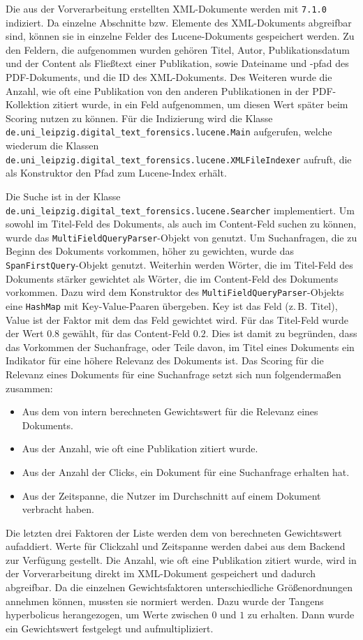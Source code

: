 Die aus der Vorverarbeitung erstellten XML-Dokumente werden mit
\lucene \lstinline{7.1.0} indiziert.  Da einzelne Abschnitte
bzw. Elemente des XML-Dokuments abgreifbar sind, können sie in
einzelne Felder des Lucene-Dokuments gespeichert werden.  Zu den
Feldern, die aufgenommen wurden gehören Titel, Autor,
Publikationsdatum und der Content als Fließtext einer Publikation,
sowie Dateiname und -pfad des PDF-Dokuments, und die ID des
XML-Dokuments.  Des Weiteren wurde die Anzahl, wie oft eine
Publikation von den anderen Publikationen in der PDF-Kollektion
zitiert wurde, in ein Feld aufgenommen, um diesen Wert später beim
Scoring nutzen zu können.  Für die Indizierung wird die Klasse
\lstinline{de.uni_leipzig.digital_text_forensics.lucene.Main}
aufgerufen, welche wiederum die Klassen
\lstinline{de.uni_leipzig.digital_text_forensics.lucene.XMLFileIndexer}
aufruft, die als Konstruktor den Pfad zum Lucene-Index erhält.

Die Suche ist in der Klasse \lstinline{de.uni_leipzig.digital_text_forensics.lucene.Searcher} implementiert. 
Um sowohl im Titel-Feld des Dokuments, als auch im Content-Feld suchen zu können, wurde das \lstinline{MultiFieldQueryParser}-Objekt von \lucene genutzt. 
Um Suchanfragen, die zu Beginn des Dokuments vorkommen, höher zu gewichten, wurde das \lstinline{SpanFirstQuery}-Objekt genutzt. 
Weiterhin werden Wörter, die im Titel-Feld des Dokuments stärker gewichtet als Wörter, die im Content-Feld des Dokuments vorkommen. 
Dazu wird dem Konstruktor des \lstinline{MultiFieldQueryParser}-Objekts eine \lstinline{HashMap} mit Key-Value-Paaren übergeben. 
Key ist das Feld (z.\,B. Titel), Value ist der Faktor mit dem das Feld gewichtet wird. 
Für das Titel-Feld wurde der Wert $0.8$ gewählt, für das Content-Feld $0.2$. 
Dies ist damit zu begründen, dass das Vorkommen der Suchanfrage, oder Teile davon, im Titel eines Dokuments ein Indikator für eine höhere Relevanz des Dokuments ist.  
Das Scoring für die Relevanz eines Dokuments für eine Suchanfrage setzt sich nun folgendermaßen zusammen: 
\begin{itemize} 
	\item Aus dem von \lucene intern berechneten Gewichtswert für die Relevanz eines Dokuments. 
	\item Aus der Anzahl, wie oft eine Publikation zitiert wurde. 
	\item Aus der Anzahl der Clicks, ein Dokument für eine Suchanfrage erhalten hat. 
	\item Aus der Zeitspanne, die Nutzer im Durchschnitt auf einem Dokument verbracht haben. 
\end{itemize}
Die letzten drei Faktoren der Liste werden dem von \lucene berechneten Gewichtswert aufaddiert. 
Werte für Clickzahl und Zeitspanne werden dabei aus dem Backend zur Verfügung gestellt. 
Die Anzahl, wie oft eine Publikation zitiert wurde, wird in der Vorverarbeitung direkt im XML-Dokument gespeichert und dadurch abgreifbar. 
Da die einzelnen Gewichtsfaktoren unterschiedliche Größenordnungen annehmen können, mussten sie normiert werden. 
Dazu wurde der Tangens hyperbolicus herangezogen, um Werte zwischen $0$ und $1$ zu erhalten. 
Dann wurde ein Gewichtswert festgelegt und aufmultipliziert. 

